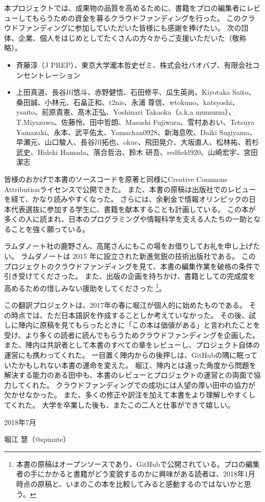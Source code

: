 本プロジェクトでは、成果物の品質を高めるために、書籍をプロの編集者にレビューしてもらうための資金を募るクラウドファンディングを行った。
このクラウドファンディングに参加していただいた皆様にも感謝を捧げたい。
次の団体、企業、個人をはじめとしてたくさんの方々からご支援いただいた（敬称略）。 %
\begin{itemize}
\item 斉藤淳（J PREP）、東京大学瀧本哲史ゼミ、株式会社バオバブ、有限会社コンセントレーション
\item 上田真道、長谷川悠斗、赤野健悟、石田修平、瓜生英尚、Kiyotaka Saito、桑田誠、小林元、石畠正和、t2nis、永浦 尊信、wtokuno、katsyoshi、ysaito、前原貴憲、髙木正弘、Yoshinari Takaoka（a.k.a mumumu）、T.Miyazawa、佐藤怜、田中哲朗、Masashi Fujiwara、雪村あおい、Tetsuya Yamazaki、永本、武平佑太、Yamachan0928、新海息吹、Daiki Sugiyama、早瀬元、山口駿人、長谷川拓也、okue、飛田晃介、大坂直人、松林祐、若杉武史、Hideki Hamada、落合哲治、鈴木 研吾、redfield920、山崎宏宇、宮田潔志
\end{itemize}

皆様のおかげで本書のソースコードを原著と同様にCreative Commons Attributionライセンスで公開できた。
また、本書の原稿は出版社でのレビューを経て、かなり読みやすくなった。
さらには、余剰金で情報オリンピックの日本代表選抜に参加する学生に、書籍を献本することも計画している。
この本が多くの人に読まれ、日本のプログラミングや情報科学を支える人たちの一助となることを強く願っている。

ラムダノート社の鹿野さん、高尾さんにもこの場をお借りしてお礼を申し上げたい。
ラムダノートは 2015 年に設立された新進気鋭の技術出版社である。
このプロジェクトのクラウドファンディングを見て、本書の編集作業を破格の条件で引き受けてくださった。
また、出版の企画を持ちかけ、書籍としての完成度を高めるための惜しみない援助をしてくださった
\footnote{本書の原稿はオープンソースであり、GitHubで公開されている。プロの編集者の手にかかると書籍がどう変貌するのかに興味がある読者は、2018年1月時点の原稿と、いまのこの本を比較してみると感動するのではないかと思う。}。

この翻訳プロジェクトは、2017年の春に堀江が個人的に始めたものである。
その時点では、ただ日本語訳を作成することしか考えていなかった。
その後、試しに陣内に原稿を見てもらったときに「この本は価値がある」と言われたことを受け、より多くの読者に読んでもらうためクラウドファンディングを企画した。
また、陣内は共訳者として本書のすべての章をレビューし、プロジェクト自体の運営にも携わってくれた。
一目置く陣内からの後押しは、GitHubの隅に眠っていたかもしれない本書の運命を変えた。
堀江、陣内とは違った角度から問題を解決する能力のある田中も、本書のレビューとプロジェクトの運営との両面で協力してくれた。
クラウドファンディングでの成功には人望の厚い田中の協力が欠かせなかった。
また、多くの修正や訳注を加えて本書をより理解しやすくしてくれた。
大学を卒業した後も、またこの二人と仕事ができて嬉しい。

\noindent\hspace*{2em}
2018年7月

\hfill 堀江 慧（@spinute）
